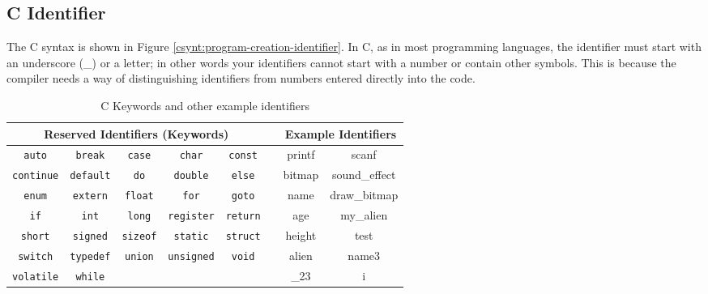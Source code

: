 \clearpage
\subsection{C Identifier} %
\label{sub:c_identifier}

The C  syntax is shown in Figure \ref{csynt:program-creation-identifier}. In C, as in most programming languages, the identifier must start with an underscore (\_) or a letter; in other words your identifiers cannot start with a number or contain other symbols. This is because the compiler needs a way of distinguishing identifiers from numbers entered directly into the code.


\begin{table}[h]
  \centering
  \begin{tabular}{|ccccc|c|cc|}
    \hline
    \multicolumn{5}{|c|}{\textbf{Reserved Identifiers (Keywords)}} & & \multicolumn{2}{c|}{\textbf{Example Identifiers}} \\
    \hline
    \texttt{auto}     &   \texttt{break}    & \texttt{case}     &   \texttt{char}     &   \texttt{const}  & & printf & scanf  \\         
    \texttt{continue} &   \texttt{default}  &  \texttt{do}      &   \texttt{double}   &   \texttt{else}   & & bitmap & sound\_effect  \\
    \texttt{enum}     &   \texttt{extern}   & \texttt{float}    &   \texttt{for}      &   \texttt{goto}   & & name & draw\_bitmap  \\
    \texttt{if}       &   \texttt{int}      &   \texttt{long}   &   \texttt{register} &   \texttt{return} & & age & my\_alien \\         
    \texttt{short}    &   \texttt{signed}   & \texttt{sizeof}   &   \texttt{static}   &   \texttt{struct} & & height & test  \\          
    \texttt{switch}   & \texttt{typedef}  &   \texttt{union}    &   \texttt{unsigned} &   \texttt{void}   & & alien & name3 \\
    \texttt{volatile} &   \texttt{while}    &  & & &                                                        & \_23  & i \\
    \hline
  \end{tabular}
  \caption{C Keywords and other example identifiers}
  \label{tbl:program-creation-c identifiers and keywords}
\end{table}

